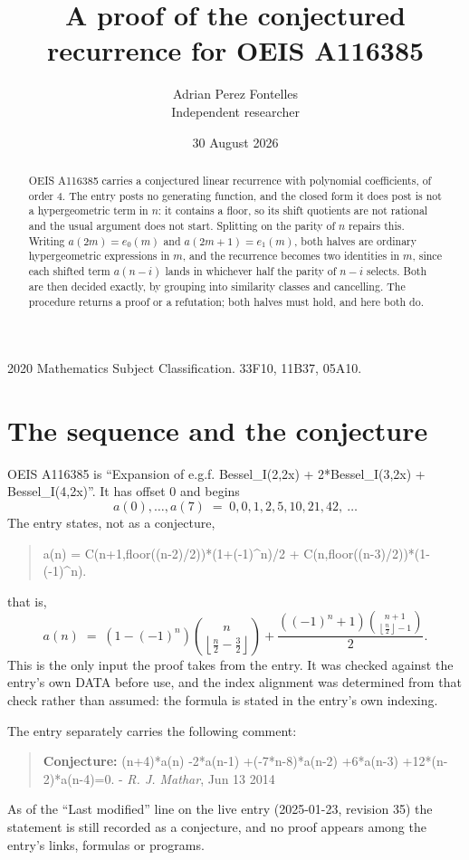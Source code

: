 \documentclass[11pt,a4paper]{article}
\title{A proof of the conjectured recurrence for OEIS A116385}
\author{Adrian Perez Fontelles\\ \small Independent researcher}
\date{30 August 2026}
\theoremstyle{plain}
\theoremstyle{definition}
\begin{document}
\maketitle

\begin{abstract}
OEIS A116385 carries a conjectured linear recurrence with polynomial coefficients, of
order 4. The entry posts no generating function, and the closed form it does post
is not a hypergeometric term in $n$: it contains a floor, so its shift quotients are not
rational and the usual argument does not start. Splitting on the parity of $n$ repairs
this. Writing $a(2m)=e_{0}(m)$ and $a(2m+1)=e_{1}(m)$, both halves are ordinary
hypergeometric expressions in $m$, and the recurrence becomes two identities in $m$, since
each shifted term $a(n-i)$ lands in whichever half the parity of $n-i$ selects. Both are
then decided exactly, by grouping into similarity classes and cancelling. The procedure
returns a proof or a refutation; both halves must hold, and here both do.
\end{abstract}

\noindent\small 2020 Mathematics Subject Classification. 33F10, 11B37, 05A10.\normalsize

\section{The sequence and the conjecture}

OEIS A116385 is ``Expansion of e.g.f. Bessel\_I(2,2x) + 2*Bessel\_I(3,2x) + Bessel\_I(4,2x)''. It has offset $0$ and begins
\[
a(0),\dots,a(7)\;=\;0, 0, 1, 2, 5, 10, 21, 42,\ \dots
\]
The entry states, not as a conjecture,
\begin{quote}\small
a(n) = C(n+1,floor((n-2)/2))*(1+(-1)\^{}n)/2 + C(n,floor((n-3)/2))*(1-(-1)\^{}n).
\end{quote}
that is,
\begin{equation}\label{eq:cf}
a(n)\;=\;\left(1 - \left(-1\right)^{n}\right) {\binom{n}{\left\lfloor{\frac{n}{2} - \frac{3}{2}}\right\rfloor}} + \frac{\left(\left(-1\right)^{n} + 1\right) {\binom{n + 1}{\left\lfloor{\frac{n}{2}}\right\rfloor - 1}}}{2} .
\end{equation}
This is the only input the proof takes from the entry. It was checked against the entry's
own DATA before use, and the index alignment was determined from that check rather than
assumed: the formula is stated in the entry's own indexing.

The entry separately carries the following comment:
\begin{quote}\small
\textbf{Conjecture:} (n+4)*a(n) -2*a(n-1) +(-7*n-8)*a(n-2) +6*a(n-3) +12*(n-2)*a(n-4)=0. - \emph{R. J. Mathar}, Jun 13 2014
\end{quote}
As of the ``Last modified'' line on the live entry (2025-01-23, revision 35) the
statement is still recorded as a conjecture, and no proof appears among the entry's links,
formulas or programs.
\end{document}
